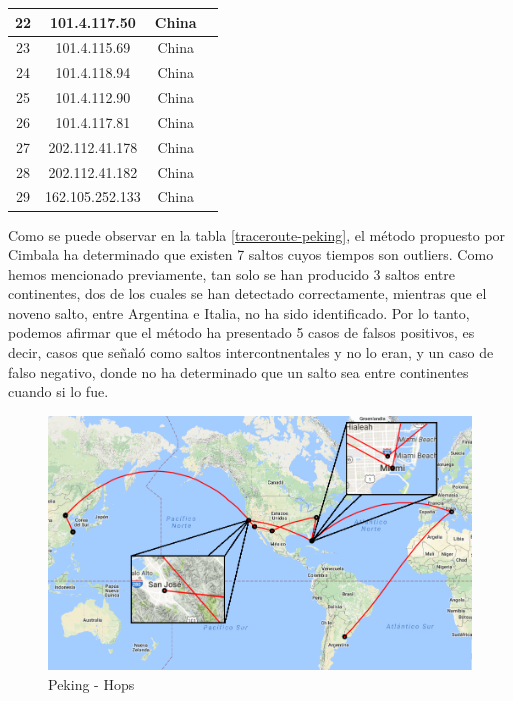 \begin{table}[!htbp]
\begin{tabular}{|c|c|c|c|}
22           & 101.4.117.50                   & China            &                   \\ \hline
23           & 101.4.115.69                   & China            &                   \\ \hline
24           & 101.4.118.94                   & China            &                   \\ \hline
25           & 101.4.112.90                   & China            &                   \\ \hline
26           & 101.4.117.81                   & China            &                   \\ \hline
27           & 202.112.41.178                 & China            &                   \\ \hline
28           & 202.112.41.182                 & China            &                   \\ \hline
29           & 162.105.252.133                & China            &                   \\ \hline
\end{tabular}
\end{table}


Como se puede observar en la tabla \ref{traceroute-peking}, el método propuesto por Cimbala ha determinado que existen 7 saltos cuyos tiempos son outliers. Como hemos mencionado previamente, tan solo se han producido 3 saltos entre continentes, dos de los cuales se han detectado correctamente, mientras que el noveno salto, entre Argentina e Italia, no ha sido identificado. Por lo tanto, podemos afirmar que el método ha presentado 5 casos de falsos positivos, es decir, casos que señaló como saltos intercontnentales y no lo eran, y un caso de falso negativo, donde no ha determinado que un salto sea entre continentes cuando si lo fue.

\begin{figure}[!htbp]
  \centering
    \includegraphics[scale=0.6]{imagenes/peking-graficos/mapa-peking.png}
  \caption{Peking - Hops}
  \label{mapa-peking}
\end{figure}

